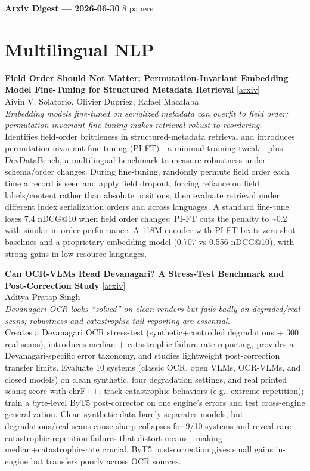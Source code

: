 \documentclass[12pt,letterpaper]{article}
\begin{document}
{\footnotesize\textbf{Arxiv Digest --- 2026-06-30} \hfill 8 papers}

\smallskip

\section*{Multilingual NLP}

{\small\textbf{Field Order Should Not Matter: Permutation-Invariant Embedding Model Fine-Tuning for Structured Metadata Retrieval}} {\scriptsize[\href{https://arxiv.org/abs/2606.30473}{arxiv}]}\\
{\scriptsize Aivin V. Solatorio, Olivier Dupriez, Rafael Macalaba}\\

{\small\textit{Embedding models fine-tuned on serialized metadata can overfit to field order; permutation-invariant fine-tuning makes retrieval robust to reordering.}}\\[1pt]
{\footnotesize Identifies field-order brittleness in structured-metadata retrieval and introduces permutation-invariant fine-tuning (PI-FT)---a minimal training tweak---plus DevDataBench, a multilingual benchmark to measure robustness under schema/order changes. During fine-tuning, randomly permute field order each time a record is seen and apply field dropout, forcing reliance on field labels/content rather than absolute positions; then evaluate retrieval under different index serialization orders and across languages. A standard fine-tune loses 7.4 nDCG@10 when field order changes; PI-FT cuts the penalty to \textasciitilde{}0.2 with similar in-order performance. A 118M encoder with PI-FT beats zero-shot baselines and a proprietary embedding model (0.707 vs 0.556 nDCG@10), with strong gains in low-resource languages.}

\medskip

{\small\textbf{Can OCR-VLMs Read Devanagari? A Stress-Test Benchmark and Post-Correction Study}} {\scriptsize[\href{https://arxiv.org/abs/2606.29213}{arxiv}]}\\
{\scriptsize Aditya Pratap Singh}\\

{\small\textit{Devanagari OCR looks ``solved'' on clean renders but fails badly on degraded/real scans; robustness and catastrophic-tail reporting are essential.}}\\[1pt]
{\footnotesize Creates a Devanagari OCR stress-test (synthetic+controlled degradations + 300 real scans), introduces median + catastrophic-failure-rate reporting, provides a Devanagari-specific error taxonomy, and studies lightweight post-correction transfer limits. Evaluate 10 systems (classic OCR, open VLMs, OCR-VLMs, and closed models) on clean synthetic, four degradation settings, and real printed scans; score with chrF++; track catastrophic behaviors (e.g., extreme repetition); train a byte-level ByT5 post-corrector on one engine's errors and test cross-engine generalization. Clean synthetic data barely separates models, but degradations/real scans cause sharp collapses for 9/10 systems and reveal rare catastrophic repetition failures that distort means---making median+catastrophic-rate crucial. ByT5 post-correction gives small gains in-engine but transfers poorly across OCR sources.}
\end{document}
